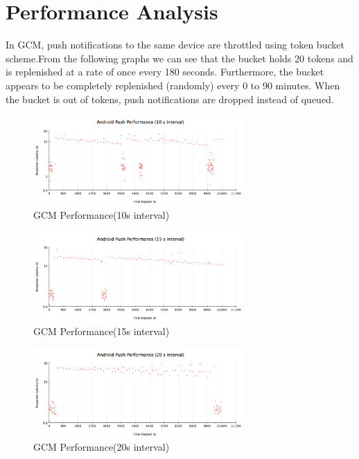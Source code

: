 \section{Performance Analysis}
In GCM, push notifications to the same device are throttled using token bucket scheme.From the following graphs we can see that the bucket holds 20 tokens and is replenished at a rate of once every 180 seconds. Furthermore, the bucket appears to be completely replenished (randomly) every 0 to 90 minutes. When the bucket is out of tokens, push notifications are dropped instead of queued.
\begin{figure}[h]
\centering
\includegraphics[width=8cm]{images/graph1.png}
\caption{\label{fig:g1}GCM Performance(10s interval)}
\end{figure}
\begin{figure}[h]
\centering
\includegraphics[width=8cm]{images/graph2.png}
\caption{\label{fig:g2}GCM Performance(15s interval)}
\end{figure}
\begin{figure}[h]
\centering
\includegraphics[width=8cm]{images/graph3.png}
\caption{\label{fig:g3}GCM Performance(20s interval)}
\end{figure}
